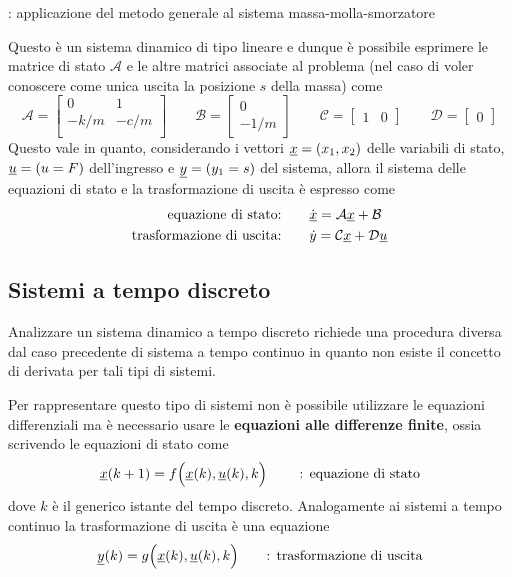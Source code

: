 \begin{esempio}{: applicazione del metodo generale al sistema massa-molla-smorzatore}
\begin{itemize}
 		\end{itemize}
 		
 		\vspace{3mm}
 		Questo è un sistema dinamico di tipo lineare e dunque è possibile esprimere le matrice di stato $\mathcal A$ e le altre matrici associate al problema (nel caso di voler conoscere come unica uscita la posizione $s$ della massa) come
 		\[ \mathcal A = \begin{bmatrix}
 			0 & 1 \\ 
 			-k/m & -c/m \\
 		\end{bmatrix}\qquad \mathcal B = \begin{bmatrix}
 			0 \\ -1/m
 		\end{bmatrix} \qquad \mathcal C = \begin{bmatrix}
 			1 & 0
 		\end{bmatrix} \qquad \mathcal D = \begin{bmatrix} 0
 		\end{bmatrix}\]
 		Questo vale in quanto, considerando i vettori $\underline{x} = (x_1, x_2)$ delle variabili di stato, $\underline{u} = (u=F)$ dell'ingresso e $\underline{y} = (y_1=s)$ del sistema, allora il sistema delle equazioni di stato e la trasformazione di uscita è espresso come
 		\begin{align*}
 			\textrm{equazione di stato:} \qquad & \dot{\underline{x}} = \mathcal A \underline{x} + \mathcal B \\
 			\textrm{trasformazione di uscita:} \qquad & \dot y = \mathcal C \underline{x} + \mathcal D \underline{u}
 		\end{align*}
 		
 	\end{esempio}
 	
 	\subsection{Sistemi a tempo discreto}
 		Analizzare un sistema dinamico a tempo discreto richiede una procedura diversa dal caso precedente di sistema a tempo continuo in quanto non esiste il concetto di derivata per tali tipi di sistemi.
 		
 		Per rappresentare questo tipo di sistemi non è possibile utilizzare le equazioni differenziali ma è necessario usare le \textbf{equazioni alle differenze finite}, ossia scrivendo le equazioni di stato come
 		\[ \underline{x} (k+1) = f\Big( \underline{x}(k), \underline{u} (k) , k \Big) \qquad\textrm{ : equazione di stato} \]
 		dove $k$ è il generico istante del tempo discreto.  		Analogamente ai sistemi a tempo continuo la trasformazione di uscita è una equazione
 		\[ \underline{y}(k) = g \Big(\underline{x}(k),\underline{u}(k), k\Big) \qquad \textrm{: trasformazione di uscita} \]
 		
